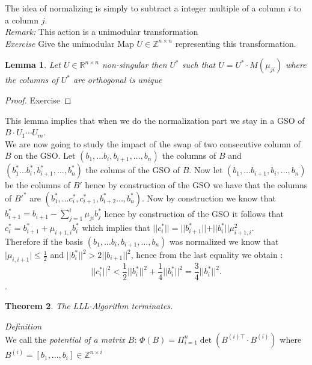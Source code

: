 \documentclass[a4paper,11pt,american]{article}
\newcommand{\R}{\mathbb{R}}
\newcommand{\Z}{\mathbb{Z}}
\newcommand{\norm}[1]{\vert\vert#1\vert\vert}
\theoremstyle{plain}
\newtheorem{theorem}{Theorem}
\newtheorem{lemma}[theorem]{Lemma}
\theoremstyle{definition}
\begin{document}
The idea of normalizing is simply to subtract a integer multiple of a column $i$ to a column $j$.\\
\emph{Remark:} This action is a unimodular transformation \\
\emph{Exercise} Give the unimodular Map $U\in\Z^{n\times n}$ representing this transformation.\\
\begin{lemma}
    Let $U\in\R^{n\times n}$ non-singular then $U^*$ such that $U=U^*\cdot M(\mu_{ji})$ where the columns of $U^*$ are orthogonal is unique 
\end{lemma}
\begin{proof}
    Exercise
\end{proof}
This lemma implies that when we do the normalization part we stay in a GSO of $B\cdot U_1\cdots U_m$.\\
We are now going to study the impact of the swap of two consecutive column of $B$ on the GSO. Let $(b_1,\dots b_i,b_{i+1},\dots,b_n)$ the columns of $B$ and $(b_1^*\dots b_i^*,b_{i+1}^*,\dots,b_n^*)$ the colums of the GSO of $B$. Now let $(b_1,\dots b_{i+1},b_{i},\dots,b_n)$ be the columns of $B'$ hence by construction of the GSO we have that the columns of $B'^*$ are $(b_1^*,\dots c_i^*,c_{i+1}^*,b_{i+2}^*\dots,b_n^*)$. Now by construction we know that $b_{i+1}^*=b_{i+1}-\sum_{j=1}^i\mu_{ji}b_j^*$ hence by construction of the GSO it follows that $c_i^*=b_{i+1}^*+\mu_{i+1,i}b_i^*$ which implies that $\norm{c_i^*}=\norm {b_{i+1}^*}+\norm{b_i^*}\mu_{i+1,i}^2$.\\ Therefore if the basis $(b_1,\dots b_i,b_{i+1},\dots,b_n)$ was normalized we know that $\vert\mu_{i,i+1}\vert\leq \frac{1}{2}$ and $\norm{b_i^*}^2> 2\norm{b_{i+1}}^2$, hence from the last equality we obtain : \begin{equation*}\label{3/4}
    \norm{c_i^*}^2<\frac{1}{2}\norm{b_i^*}^2+\frac{1}{4}\norm{b_i^*}^2=\frac{3}{4}\norm{b_i^*}^2.
\end{equation*}.\\
\begin{theorem}
    The LLL-Algorithm terminates.
\end{theorem}
\emph{Definition}\\
We call the \emph{potential of a matrix $B$}: $\Phi(B)=\Pi^n_{i=1} \det(B^{(i)\top}\cdot B^{(i)})$ where $B^{(i)}=[b_1,\dots,b_i]\in\Z^{n\times i}$
\end{document}
